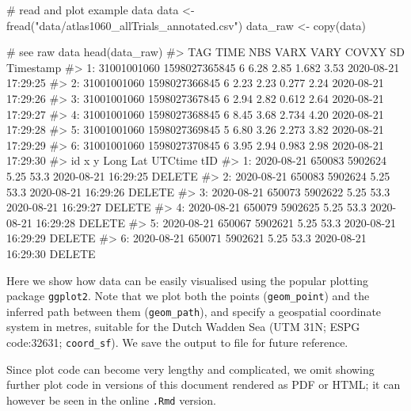 \documentclass[]{scrreprt}
\newenvironment{Shaded}{}{}
\newcommand{\CommentTok}[1]{\textcolor[rgb]{0.00,0.50,0.00}{#1}}
\newcommand{\KeywordTok}[1]{\textcolor[rgb]{0.00,0.00,1.00}{#1}}
\newcommand{\NormalTok}[1]{#1}
\newcommand{\StringTok}[1]{\textcolor[rgb]{0.00,0.50,0.50}{#1}}
\begin{document}
\begin{Shaded}
\begin{Highlighting}[]
\CommentTok{# read and plot example data}
\NormalTok{data <-}\StringTok{ }\KeywordTok{fread}\NormalTok{(}\StringTok{"data/atlas1060_allTrials_annotated.csv"}\NormalTok{)}
\NormalTok{data_raw <-}\StringTok{ }\KeywordTok{copy}\NormalTok{(data)}

\CommentTok{# see raw data}
\KeywordTok{head}\NormalTok{(data_raw)}
\CommentTok{#>            TAG          TIME NBS VARX VARY COVXY   SD           Timestamp}
\CommentTok{#> 1: 31001001060 1598027365845   6 6.28 2.85 1.682 3.53 2020-08-21 17:29:25}
\CommentTok{#> 2: 31001001060 1598027366845   6 2.23 2.23 0.277 2.24 2020-08-21 17:29:26}
\CommentTok{#> 3: 31001001060 1598027367845   6 2.94 2.82 0.612 2.64 2020-08-21 17:29:27}
\CommentTok{#> 4: 31001001060 1598027368845   6 8.45 3.68 2.734 4.20 2020-08-21 17:29:28}
\CommentTok{#> 5: 31001001060 1598027369845   5 6.80 3.26 2.273 3.82 2020-08-21 17:29:29}
\CommentTok{#> 6: 31001001060 1598027370845   6 3.95 2.94 0.983 2.98 2020-08-21 17:29:30}
\CommentTok{#>            id      x       y Long  Lat             UTCtime    tID}
\CommentTok{#> 1: 2020-08-21 650083 5902624 5.25 53.3 2020-08-21 16:29:25 DELETE}
\CommentTok{#> 2: 2020-08-21 650083 5902624 5.25 53.3 2020-08-21 16:29:26 DELETE}
\CommentTok{#> 3: 2020-08-21 650073 5902622 5.25 53.3 2020-08-21 16:29:27 DELETE}
\CommentTok{#> 4: 2020-08-21 650079 5902625 5.25 53.3 2020-08-21 16:29:28 DELETE}
\CommentTok{#> 5: 2020-08-21 650067 5902621 5.25 53.3 2020-08-21 16:29:29 DELETE}
\CommentTok{#> 6: 2020-08-21 650071 5902621 5.25 53.3 2020-08-21 16:29:30 DELETE}
\end{Highlighting}
\end{Shaded}

Here we show how data can be easily visualised using the popular plotting package \texttt{ggplot2}.
Note that we plot both the points (\texttt{geom\_point}) and the inferred path between them (\texttt{geom\_path}), and specify a geospatial coordinate system in metres, suitable for the Dutch Wadden Sea (UTM 31N; ESPG code:32631; \texttt{coord\_sf}).
We save the output to file for future reference.

Since plot code can become very lengthy and complicated, we omit showing further plot code in versions of this document rendered as PDF or HTML; it can however be seen in the online \texttt{.Rmd} version.
\end{document}
